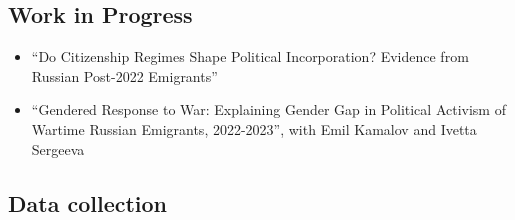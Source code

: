\documentclass[
]{article}
\begin{document}
\hypertarget{work-in-progress}{%
\subsection{Work in Progress}\label{work-in-progress}}

\begin{itemize}
\item
  ``Do Citizenship Regimes Shape Political Incorporation? Evidence from
  Russian Post-2022 Emigrants''
\item
  ``Gendered Response to War: Explaining Gender Gap in Political
  Activism of Wartime Russian Emigrants, 2022-2023'', with Emil Kamalov
  and Ivetta Sergeeva
\end{itemize}

\hypertarget{data-collection}{%
\subsection{Data collection}\label{data-collection}}
\end{document}
